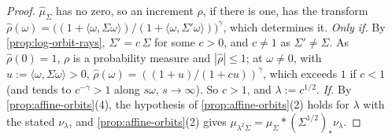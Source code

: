 \begin{proof}
\leanok
$\widehat\mu_\Sigma$ has no zero, so an increment $\rho$, if there is one, has the transform
$\widehat\rho(\omega) = \bigl((1 + \langle\omega,\Sigma\omega\rangle)/(1 + \langle\omega,\Sigma'\omega\rangle)\bigr)^\gamma$,
which determines it. \emph{Only if.} By \ref{prop:log-orbit-rays}, $\Sigma' = c\,\Sigma$ for some
$c > 0$, and $c \ne 1$ as $\Sigma' \ne \Sigma$. As $\widehat\rho(0) = 1$, $\rho$ is a probability
measure and $|\widehat\rho| \le 1$; at $\omega \ne 0$, with $u := \langle\omega,\Sigma\omega\rangle > 0$,
$\widehat\rho(\omega) = ((1+u)/(1+cu))^\gamma$, which exceeds $1$ if $c < 1$ (and tends to
$c^{-\gamma} > 1$ along $s\omega$, $s \to \infty$). So $c > 1$, and
$\lambda := c^{1/2}$. \emph{If.} By \ref{prop:affine-orbits}(4), the hypothesis of
\ref{prop:affine-orbits}(2) holds for $\lambda$ with the stated $\nu_\lambda$, and
\ref{prop:affine-orbits}(2) gives $\mu_{\lambda^2\Sigma} = \mu_\Sigma * (\Sigma^{1/2})_*\nu_\lambda$.
\end{proof}


